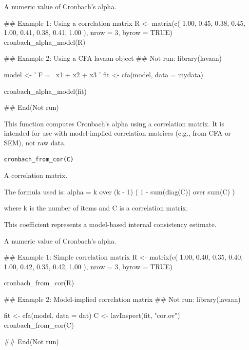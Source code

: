 \documentclass[a4paper]{book}
\begin{document}
%
\begin{Value}
A numeric value of Cronbach's alpha.
\end{Value}
%
\begin{Examples}
\begin{ExampleCode}
## Example 1: Using a correlation matrix
R <- matrix(c(
  1.00, 0.45, 0.38,
  0.45, 1.00, 0.41,
  0.38, 0.41, 1.00
), nrow = 3, byrow = TRUE)
cronbach_alpha_model(R)

## Example 2: Using a CFA lavaan object
\#\# Not run: 
library(lavaan)

model <- '
  F =~ x1 + x2 + x3
'
fit <- cfa(model, data = mydata)

cronbach_alpha_model(fit)

## End(Not run)

\end{ExampleCode}
\end{Examples}
%
\begin{Description}
This function computes Cronbach's alpha using a correlation matrix.
It is intended for use with model-implied correlation matrices
(e.g., from CFA or SEM), not raw data.
\end{Description}
%
\begin{Usage}
\begin{verbatim}
cronbach_from_cor(C)
\end{verbatim}
\end{Usage}
%
\begin{Arguments}
\begin{ldescription}
\item[\code{C}] A correlation matrix.
\end{ldescription}
\end{Arguments}
%
\begin{Details}
The formula used is:
alpha = k over (k - 1) ( 1 - sum(diag(C)) over sum(C) )

where k is the number of items and C is a correlation matrix.

This coefficient represents a model-based internal consistency estimate.
\end{Details}
%
\begin{Value}
A numeric value of Cronbach's alpha.
\end{Value}
%
\begin{Examples}
\begin{ExampleCode}
## Example 1: Simple correlation matrix
R <- matrix(c(
  1.00, 0.40, 0.35,
  0.40, 1.00, 0.42,
  0.35, 0.42, 1.00
), nrow = 3, byrow = TRUE)

cronbach_from_cor(R)

## Example 2: Model-implied correlation matrix
\#\# Not run: 
library(lavaan)

fit <- cfa(model, data = dat)
C <- lavInspect(fit, "cor.ov")
cronbach_from_cor(C)

## End(Not run)

\end{ExampleCode}
\end{Examples}
\end{document}
